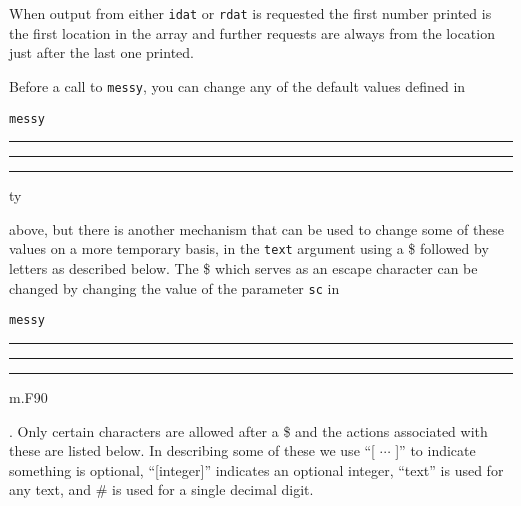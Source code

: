 \documentclass[12pt]{article}
\DeclareRobustCommand{\us}{\rule{.2pt}{0pt}\rule[-.8pt]{.4em}{.5pt}%
  \rule{.2pt}{0pt}}
\DeclareRobustCommand{\us}{\rule{.2pt}{0pt}\rule[-.8pt]{.4em}{.5pt}%
  \rule{.2pt}{0pt}}
\begin{document}
When output from either {\tt idat} or {\tt rdat} is requested the first number
printed is the first location in the array and further requests are always from
the location just after the last one printed.

Before a call to {\tt messy}, you can change any of the default values defined
in {\tt messy\us ty} above, but there is another mechanism that can be used to
change some of these values on a more temporary basis, in the {\tt text}
argument using a \$ followed by letters as described below.  The \$ which serves
as an escape character can be changed by changing the value of the parameter
{\tt sc} in {\tt messy\us m.F90}.  Only certain characters are allowed after a
\$ and the actions associated with these are listed below.  In describing some
of these we use ``[ $\cdots$ ]'' to indicate something is optional,
``[integer]'' indicates an optional integer, ``text'' is used for any text, and
\# is used for a single decimal digit.\vspace{-5pt}
\end{document}
